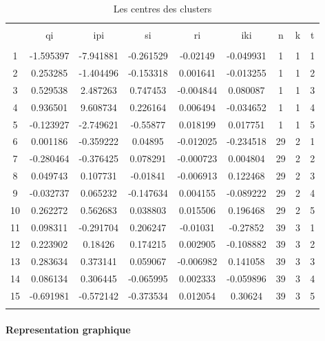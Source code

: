 \documentclass[11pt,]{article}
\let\oldparagraph\paragraph
\renewcommand{\paragraph}[1]{\oldparagraph{#1}\mbox{}}
\begin{document}
\begin{table}[!htbp] \centering 
  \caption{Les centres des clusters} 
  \label{} 
\begin{tabular}{@{\extracolsep{5pt}} ccccccccc} 
\\[-1.8ex]\hline 
\hline \\[-1.8ex] 
 & qi & ipi & si & ri & iki & n & k & t \\ 
\hline \\[-1.8ex] 
1 & -1.595397 & -7.941881 & -0.261529 & -0.02149 & -0.049931 & 1 & 1 & 1 \\ 
2 & 0.253285 & -1.404496 & -0.153318 & 0.001641 & -0.013255 & 1 & 1 & 2 \\ 
3 & 0.529538 & 2.487263 & 0.747453 & -0.004844 & 0.080087 & 1 & 1 & 3 \\ 
4 & 0.936501 & 9.608734 & 0.226164 & 0.006494 & -0.034652 & 1 & 1 & 4 \\ 
5 & -0.123927 & -2.749621 & -0.55877 & 0.018199 & 0.017751 & 1 & 1 & 5 \\ 
6 & 0.001186 & -0.359222 & 0.04895 & -0.012025 & -0.234518 & 29 & 2 & 1 \\ 
7 & -0.280464 & -0.376425 & 0.078291 & -0.000723 & 0.004804 & 29 & 2 & 2 \\ 
8 & 0.049743 & 0.107731 & -0.01841 & -0.006913 & 0.122468 & 29 & 2 & 3 \\ 
9 & -0.032737 & 0.065232 & -0.147634 & 0.004155 & -0.089222 & 29 & 2 & 4 \\ 
10 & 0.262272 & 0.562683 & 0.038803 & 0.015506 & 0.196468 & 29 & 2 & 5 \\ 
11 & 0.098311 & -0.291704 & 0.206247 & -0.01031 & -0.27852 & 39 & 3 & 1 \\ 
12 & 0.223902 & 0.18426 & 0.174215 & 0.002905 & -0.108882 & 39 & 3 & 2 \\ 
13 & 0.283634 & 0.373141 & 0.059067 & -0.006982 & 0.141058 & 39 & 3 & 3 \\ 
14 & 0.086134 & 0.306445 & -0.065995 & 0.002333 & -0.059896 & 39 & 3 & 4 \\ 
15 & -0.691981 & -0.572142 & -0.373534 & 0.012054 & 0.30624 & 39 & 3 & 5 \\ 
\hline \\[-1.8ex] 
\end{tabular} 
\end{table}

\FloatBarrier

\hypertarget{representation-graphique-1}{%
\paragraph{Representation graphique}\label{representation-graphique-1}}
\end{document}

